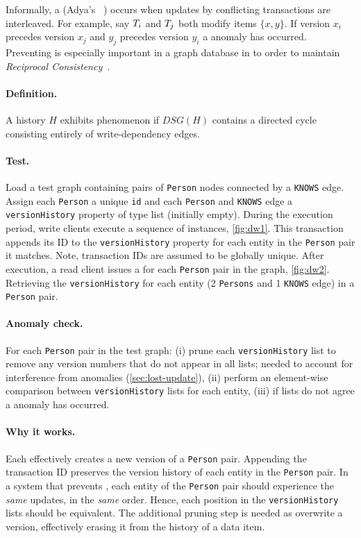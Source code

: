 Informally, a  (Adya's ~\cite{adya1999weak})
occurs when updates by conflicting transactions are interleaved.
For example, say $T_i$ and $T_j$ both modify items $\{x,y\}$.
If version $x_i$ precedes version $x_j$ and $y_j$ precedes version $y_i$ a  anomaly has occurred.
Preventing  is especially important in a graph database in to order to maintain \emph{Reciprocal Consistency}~\cite{Waudby2020}.

\paragraph{Definition.}
A history $H$ exhibits phenomenon  if $\textit{DSG}(H)$ contains a directed cycle consisting entirely of write-dependency edges.

\paragraph{Test.}
Load a test graph containing pairs of \texttt{Person} nodes connected by a \texttt{KNOWS} edge.
Assign each \texttt{Person} a unique \texttt{id} and each \texttt{Person} and \texttt{KNOWS} edge a \texttt{versionHistory} property of type list (initially empty).
During the execution period, write clients execute a sequence of  instances, \autoref{fig:dw1}.
This transaction appends its ID to the \texttt{versionHistory} property for each entity in the \texttt{Person} pair it matches.
Note, transaction IDs are assumed to be globally unique.
After execution, a read client issues a  for each \texttt{Person} pair in the graph, \autoref{fig:dw2}.
Retrieving the \texttt{versionHistory} for each entity (2 \texttt{Persons} and 1 \texttt{KNOWS} edge) in a \texttt{Person} pair.

\paragraph{Anomaly check.}
For each \texttt{Person} pair in the test graph: (i) prune each \texttt{versionHistory} list to remove any version numbers that do not appear in all lists; needed to account for interference from  anomalies (\autoref{sec:lost-update}), (ii) perform an element-wise comparison between \texttt{versionHistory} lists for each entity, (iii) if lists do not agree a  anomaly has occurred.

\paragraph{Why it works.}
Each  effectively creates a new version of a \texttt{Person} pair.
Appending the transaction ID preserves the version history of each entity in the \texttt{Person} pair.
In a system that prevents , each entity of the \texttt{Person} pair should experience the \emph{same} updates, in the \emph{same} order.
Hence, each position in the \texttt{versionHistory} lists should be equivalent.
The additional pruning step is needed as 
overwrite a version, effectively erasing it from the history of a data item.

